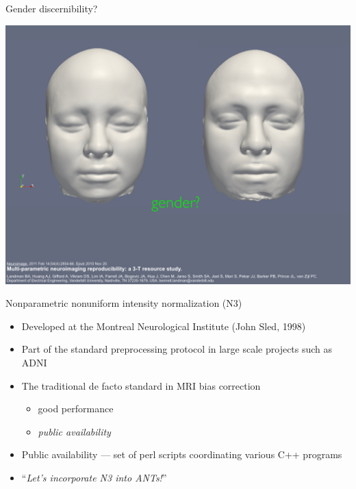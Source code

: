 \documentclass[ignorenonframetext,]{beamer}
\providecommand{\tightlist}{%
  \setlength{\itemsep}{0pt}\setlength{\parskip}{0pt}}
\begin{document}
\begin{frame}{Gender discernibility?}

\includegraphics{./papers/figures/template5.jpg}

\end{frame}

\begin{frame}{Nonparametric nonuniform intensity normalization (N3)}

\begin{itemize}
\item
  Developed at the Montreal Neurological Institute (John Sled, 1998)
\item
  Part of the standard preprocessing protocol in large scale projects
  such as ADNI
\item
  The traditional de facto standard in MRI bias correction

  \begin{itemize}
  \tightlist
  \item
    good performance
  \item
    \emph{public availability}
  \end{itemize}
\item
  Public availability --- set of perl scripts coordinating various C++
  programs
\item
  ``\emph{Let's incorporate N3 into ANTs!}''
\end{itemize}

\end{frame}
\end{document}
